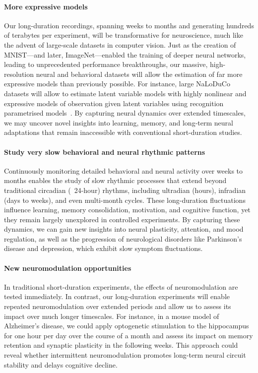 \documentclass[12pt]{article}
\begin{document}
\paragraph{More expressive models}
%
Our long-duration recordings, spanning weeks to months and generating hundreds
of terabytes per experiment, will be transformative for neuroscience, much like
the advent of large-scale datasets in computer vision.  Just as the creation of
MNIST—and later, ImageNet—enabled the training of deeper neural networks,
leading to unprecedented performance breakthroughs, our massive,
high-resolution neural and behavioral datasets will allow the estimation of far
more expressive models than previously possible.
%
For instance, large NaLoDuCo datasets will allow to estimate latent variable
models with highly nonlinear and expressive models of observation given latent
variables using recognition parametrised models~\citep{walkerEtAl23}.
%
By capturing neural dynamics over extended timescales, we may uncover novel
insights into learning, memory, and long-term neural adaptations that remain
inaccessible with conventional short-duration studies.

\paragraph{Study very slow behavioral and neural rhythmic patterns}
%
Continuously monitoring detailed behavioral and neural activity over weeks to
months enables the study of slow rhythmic processes that extend beyond
traditional circadian (~24-hour) rhythms, including ultradian (hours),
infradian (days to weeks), and even multi-month cycles. These long-duration
fluctuations influence learning, memory consolidation, motivation, and
cognitive function, yet they remain largely unexplored in controlled
experiments. By capturing these dynamics, we can gain new insights into neural
plasticity, attention, and mood regulation, as well as the progression of
neurological disorders like Parkinson’s disease and depression, which exhibit
slow symptom fluctuations.

\paragraph{New neuromodulation opportunities}
%
In traditional short-duration experiments, the effects of neuromodulation are
tested immediately. In contrast, our long-duration experiments will enable
repeated neuromodulation over extended periods and allow us to assess its
impact over much longer timescales.
%
For instance, in a mouse model of Alzheimer's disease, we could apply
optogenetic stimulation to the hippocampus for one hour per day over the course
of a month and assess its impact on memory retention and synaptic plasticity in
the following weeks. This approach could reveal whether intermittent
neuromodulation promotes long-term neural circuit stability and delays
cognitive decline.
\end{document}
